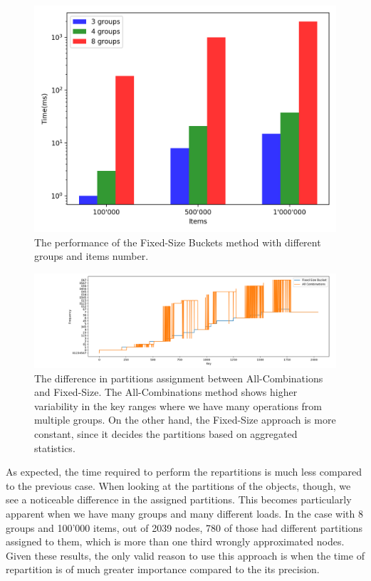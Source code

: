 \begin{figure}[!htb]
  \centering
  \includegraphics[width=\textwidth,height=\textheight,keepaspectratio]{img/fixed.png}
  \caption[caption]{The performance of the Fixed-Size Buckets method with different groups and items number.}
  \label{fig:fixed}
\end{figure}

\begin{figure}[!htb]
  \centering
  \includegraphics[width=\textwidth,height=\textheight,keepaspectratio]{img/partition_difference_fixed_all.png}
  \caption[caption]{The difference in partitions assignment between All-Combinations and Fixed-Size. The All-Combinations method shows higher variability in the key ranges where we have many operations from multiple groups. On the other hand, the Fixed-Size approach is more constant, since it decides the partitions based on aggregated statistics.}
  \label{fig:hot}
\end{figure}

As expected, the time required to perform the repartitions is much less compared to the previous case. When looking at the partitions of the objects, though, we see a noticeable difference in the assigned partitions. This becomes particularly apparent when we have many groups and many different loads. In the case with 8 groups and 100'000 items, out of 2039 nodes, 780 of those had different partitions assigned to them, which is more than one third wrongly approximated nodes. Given these results, the only valid reason to use this approach is when the time of repartition is of much greater importance compared to the its precision.

